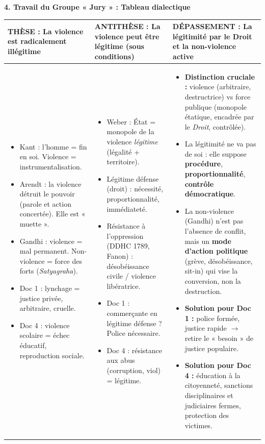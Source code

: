 \documentclass[11pt]{article}
\newcommand{\cle}[1]{{\popxbold\color{popdark}#1}}
\begin{document}
\begin{exoresolu}
\textbf{4. Travail du Groupe « Jury » : Tableau dialectique}
\begin{center}
\begin{tabularx}{\linewidth}{|X|X|X|}\hline
\rowcolor{popblueL}
\textbf{THÈSE : La violence est radicalement illégitime} & \textbf{ANTITHÈSE : La violence peut être légitime (sous conditions)} & \textbf{DÉPASSEMENT : La légitimité par le Droit et la non-violence active} \\ \hline
\begin{itemize}
    \item Kant : l'homme = fin en soi. Violence = instrumentalisation.
    \item Arendt : la violence détruit le pouvoir (parole et action concertée). Elle est « muette ».
    \item Gandhi : violence = mal permanent. Non-violence = force des forts (\emph{Satyagraha}).
    \item Doc 1 : lynchage = justice privée, arbitraire, cruelle.
    \item Doc 4 : violence scolaire = échec éducatif, reproduction sociale.
\end{itemize} & \begin{itemize}
    \item Weber : État = monopole de la violence \emph{légitime} (légalité + territoire).
    \item Légitime défense (droit) : nécessité, proportionnalité, immédiateté.
    \item Résistance à l'oppression (DDHC 1789, Fanon) : désobéissance civile / violence libératrice.
    \item Doc 1 : commerçante en légitime défense ? Police nécessaire.
    \item Doc 4 : résistance aux abus (corruption, viol) = légitime.
\end{itemize} & \begin{itemize}
    \item \textbf{Distinction cruciale :} \cle{violence} (arbitraire, destructrice) vs \cle{force publique} (monopole étatique, encadrée par le \emph{Droit}, contrôlée).
    \item La \cle{légitimité} ne va pas de soi : elle suppose \textbf{procédure}, \textbf{proportionnalité}, \textbf{contrôle démocratique}.
    \item La \cle{non-violence} (Gandhi) n'est pas l'absence de conflit, mais un \textbf{mode d'action politique} (grève, désobéissance, sit-in) qui vise la conversion, non la destruction.
    \item \textbf{Solution pour Doc 1 :} police formée, justice rapide $\rightarrow$ retire le « besoin » de justice populaire.
    \item \textbf{Solution pour Doc 4 :} éducation à la citoyenneté, sanctions disciplinaires et judiciaires fermes, protection des victimes.
\end{itemize} \\ \hline
\end{tabularx}
\end{center}


\end{exoresolu}
\end{document}
